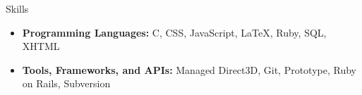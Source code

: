 \documentclass[11pt,oneside]{article}
\newenvironment{ressection}[1]{
	\vspace{2pt}
	{\selectfont\Large#1}
	\begin{itemize}
	\vspace{3pt}
}{
	\end{itemize}
}
\newcommand{\resitem}[1]{
	\vspace{-4pt}
	\item \begin{flushleft} #1 \end{flushleft}
}
\begin{document}
\begin{ressection}{Skills}

	
	\resitem{{\bfseries Programming Languages:} C, CSS, JavaScript, \LaTeX, Ruby, SQL, XHTML}
	
	\resitem{{\bfseries Tools, Frameworks, and APIs:} Managed Direct3D, Git, Prototype, Ruby on Rails, Subversion}

\end{ressection}

%
\end{document}

